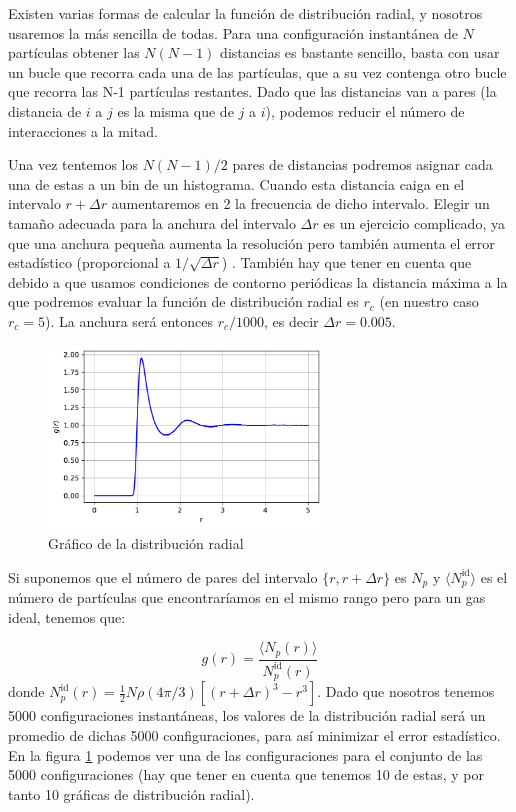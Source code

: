 \documentclass[11pt]{article} %
\begin{document}
Existen varias formas de calcular la función de distribución radial, y nosotros usaremos la más sencilla de todas. Para una configuración instantánea de $N$ partículas  obtener las $N(N-1)$ distancias es bastante sencillo, basta con usar un bucle que recorra cada una de las partículas, que a su vez contenga otro bucle que recorra las N-1 partículas restantes. Dado que las distancias van a pares (la distancia de $i$ a $j$ es la misma que de $j$ a $i$), podemos reducir el número de interacciones a la mitad. 

Una vez tentemos los $N(N-1)/2$ pares de distancias podremos asignar cada una de estas a un bin de un histograma. Cuando esta distancia caiga en el intervalo  $r+\Delta r$ aumentaremos en 2 la frecuencia de dicho intervalo. Elegir un tamaño adecuada para la anchura del intervalo $\Delta r$ es un ejercicio complicado, ya que una anchura pequeña aumenta la resolución pero también aumenta el error estadístico (proporcional a $1/\sqrt{\Delta r}$) \cite{Frenkel}. También hay que tener en cuenta que debido a que usamos condiciones de contorno periódicas la distancia máxima a la que podremos evaluar la función de distribución radial es $r_c$ (en nuestro caso $r_c=5$). La anchura será entonces $r_c/1000$, es decir $\Delta r=0.005$.


\begin{figure}[h!] \centering
	\includegraphics[width=0.65\textwidth]{../../Graficas/Optativo2/gr.pdf}
	\caption{Gráfico de la distribución radial}
	\label{Fig:01}
\end{figure}

Si suponemos que el número de pares del intervalo $\{ r, r+\Delta r\}$ es $N_p$ y $\langle N_p^{\text{id}} \rangle$ es el número de partículas que encontraríamos en el mismo rango pero para un gas ideal, tenemos que:

\begin{equation}
	g(r) = \frac{\langle N_p (r)\rangle}{N_p^{\text{id}}(r)}
\end{equation}
donde $N_p^{\text{id}}(r)=\frac{1}{2} N \rho (4 \pi/3) [(r+\Delta r)^3-r^3]$. Dado que nosotros tenemos 5000 configuraciones instantáneas, los valores de la distribución radial será un promedio de dichas 5000 configuraciones, para así minimizar el error estadístico. En la figura \ref{Fig:01} podemos ver una de las configuraciones para el conjunto de las 5000 configuraciones (hay que tener en cuenta que tenemos 10 de estas, y por tanto 10 gráficas de distribución radial).
\end{document}
